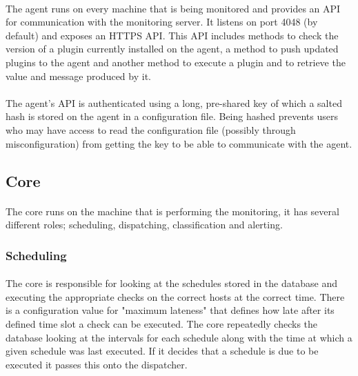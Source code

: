 \documentclass[bsc,logo,twoside]{infthesis}
\begin{document}
\paragraph*{}
	The agent runs on every machine that is being monitored and provides an API
	for communication with the monitoring server.  It listens on port 4048 (by
	default) and exposes an HTTPS API.  This API includes methods to check the
	version of a plugin currently installed on the agent, a method to push updated
	plugins to the agent and another method to execute a plugin and to retrieve
	the value and message produced by it.
	
\paragraph*{}
	The agent's API is authenticated using a long, pre-shared key of which a salted
	hash is stored on the agent in a configuration file.  Being hashed prevents
	users who may have access to read the configuration file (possibly through
	misconfiguration) from getting the key to be able to communicate with the agent.
	
\subsection{Core}
\paragraph*{}
	The core runs on the machine that is performing the monitoring, it has several
	different roles; scheduling, dispatching, classification and alerting.
	
\subsubsection{Scheduling}
\paragraph*{}
	The core is responsible for looking at the schedules stored in the database and
	executing the appropriate checks on the correct hosts at the correct time. There
	is a configuration value for "maximum lateness" that defines how late after its
	defined time slot a check can be executed.  The core repeatedly checks the
	database looking at the intervals for each schedule along with the time at which
	a given schedule was last executed.  If it decides that a schedule is due to be
	executed it passes this onto the dispatcher.
	
\end{document}
